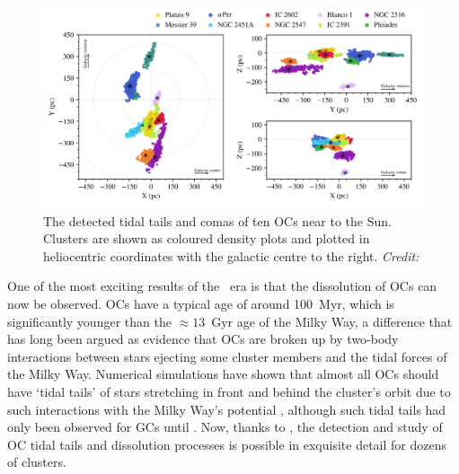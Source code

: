 \begin{figure}[tb]
	\includegraphics[width=\textwidth]{fig/c1/meingast_tidal_tails.png}
	\caption[The detected tidal tails and comas of ten OCs near to the Sun]{The detected tidal tails and comas of ten OCs near to the Sun. Clusters are shown as coloured density plots and plotted in heliocentric coordinates with the galactic centre to the right. \emph{Credit:} \cite{meingast_extended_2021}}
	\label{fig:intro:gaia:comas}
\end{figure}

One of the most exciting results of the \gaia\ era is that the dissolution of OCs can now be observed. OCs have a typical age of around 100~Myr, which is significantly younger than the $\approx 13$~Gyr age of the Milky Way, a difference that has long been argued as evidence that OCs are broken up by two-body interactions between stars ejecting some cluster members and the tidal forces of the Milky Way. Numerical simulations have shown that almost all OCs should have `tidal tails' of stars stretching in front and behind the cluster's orbit due to such interactions with the Milky Way's potential \citep{portegies_zwart_young_2010,cantat-gaudin_milky_2022}, although such tidal tails had only been observed for GCs until \gaia. Now, thanks to \gaia, the detection and study of OC tidal tails and dissolution processes is possible in exquisite detail for dozens of clusters.

